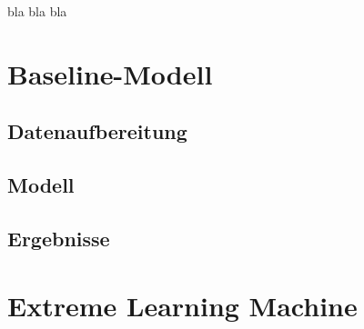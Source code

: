 bla bla bla
\section{Baseline-Modell}
\subsection{Datenaufbereitung}
\subsection{Modell}
\subsection{Ergebnisse}
\section{Extreme Learning Machine}
